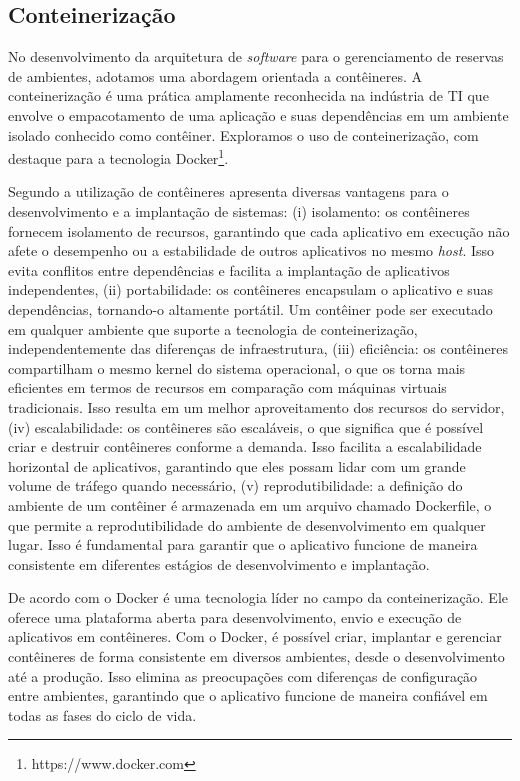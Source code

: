\documentclass[12pt]{article}
\begin{document}
\subsection{Conteinerização} \label{sec:conteinerizacao}

No desenvolvimento da arquitetura de \textit{software} para o gerenciamento de reservas de ambientes, adotamos uma abordagem orientada a contêineres. A conteinerização é uma prática amplamente reconhecida na indústria de TI que envolve o empacotamento de uma aplicação e suas dependências em um ambiente isolado conhecido como contêiner. Exploramos o uso de conteinerização, com destaque para a tecnologia Docker\footnote{https://www.docker.com}.

Segundo \cite{docker} a utilização de contêineres apresenta diversas vantagens para o desenvolvimento e a implantação de sistemas: (i) isolamento: os contêineres fornecem isolamento de recursos, garantindo que cada aplicativo em execução não afete o desempenho ou a estabilidade de outros aplicativos no mesmo \textit{host}. Isso evita conflitos entre dependências e facilita a implantação de aplicativos independentes,  (ii) portabilidade: os contêineres encapsulam o aplicativo e suas dependências, tornando-o altamente portátil. Um contêiner pode ser executado em qualquer ambiente que suporte a tecnologia de conteinerização, independentemente das diferenças de infraestrutura, (iii) eficiência: os contêineres compartilham o mesmo kernel do sistema operacional, o que os torna mais eficientes em termos de recursos em comparação com máquinas virtuais tradicionais. Isso resulta em um melhor aproveitamento dos recursos do servidor, (iv) escalabilidade: os contêineres são escaláveis, o que significa que é possível criar e destruir contêineres conforme a demanda. Isso facilita a escalabilidade horizontal de aplicativos, garantindo que eles possam lidar com um grande volume de tráfego quando necessário, (v) reprodutibilidade: a definição do ambiente de um contêiner é armazenada em um arquivo chamado Dockerfile, o que permite a reprodutibilidade do ambiente de desenvolvimento em qualquer lugar. Isso é fundamental para garantir que o aplicativo funcione de maneira consistente em diferentes estágios de desenvolvimento e implantação.

De acordo com \cite{docker} o Docker é uma tecnologia líder no campo da conteinerização. Ele oferece uma plataforma aberta para desenvolvimento, envio e execução de aplicativos em contêineres. Com o Docker, é possível criar, implantar e gerenciar contêineres de forma consistente em diversos ambientes, desde o desenvolvimento até a produção. Isso elimina as preocupações com diferenças de configuração entre ambientes, garantindo que o aplicativo funcione de maneira confiável em todas as fases do ciclo de vida.
\end{document}
